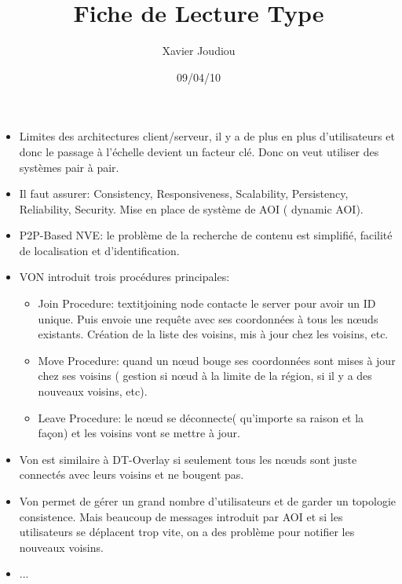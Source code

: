 \documentclass[11pt,a4paper]{article}
\title{Fiche de Lecture Type}
\author{Xavier Joudiou}
\date{09/04/10}
\begin{document}
	
  \begin{itemize}
  \renewcommand{\labelitemi}{$\Rightarrow$}
	\item Limites des architectures client/serveur, il y a de plus en plus d'utilisateurs et donc le passage à l'échelle devient un facteur clé. Donc on veut utiliser des systèmes pair à pair. 
	\item Il faut assurer: Consistency, Responsiveness, Scalability, Persistency, Reliability, Security. Mise en place de système de AOI ( dynamic AOI).
	\item P2P-Based NVE: le problème de la recherche de contenu est simplifié, facilité de localisation et d'identification. 
	\item VON introduit trois procédures principales:
	\begin{itemize}
		\item Join Procedure: textit{joining node} contacte le server pour avoir un ID unique. Puis envoie une requête avec ses coordonnées à tous les nœuds existants. Création de la liste des voisins, mis à jour chez les voisins, etc.
		\item Move Procedure: quand un nœud bouge ses coordonnées sont mises à jour chez ses voisins ( gestion si nœud à la limite de la région, si il y a des nouveaux voisins, etc).
		\item Leave Procedure: le nœud se déconnecte( qu'importe sa raison et la façon) et les voisins vont se mettre à jour. 
	\end{itemize}
	\item Von est similaire à DT-Overlay si seulement tous les nœuds sont juste connectés avec leurs voisins et ne bougent pas.
	\item Von permet de gérer un grand nombre d'utilisateurs et de garder un topologie consistence. Mais beaucoup de messages introduit par AOI et si les utilisateurs se déplacent trop vite, on  a des problème pour notifier les nouveaux voisins.
	\item ...
  \end{itemize}
\end{document}
